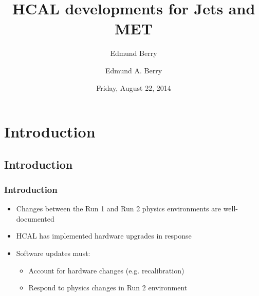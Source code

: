 \documentclass[bigger]{beamer}
\institute[Brown University]{}
\title{HCAL developments for Jets and MET}
\author{Edmund Berry}
\date{Friday, August 22, 2014}
\author[Edmund A. Berry]{\alert{Edmund A. Berry}}
\begin{document}
\maketitle


\section{Introduction}
\label{sec-1}
\subsection{Introduction}
\label{sec-1-1}
\begin{frame}
\frametitle{Introduction}
\label{sec-1-1-1}
\begin{itemize}

\item Changes between the Run 1 and Run 2 physics environments are well-documented
\label{sec-1-1-1-1}%

\item HCAL has implemented hardware upgrades in response
\label{sec-1-1-1-2}%

\item Software updates must:
\label{sec-1-1-1-3}%
\begin{itemize}

\item Account for hardware changes (e.g. recalibration)
\label{sec-1-1-1-3-1}%

\item Respond to physics changes in Run 2 environment
\label{sec-1-1-1-3-2}%
\end{itemize} %
\end{itemize} %
\end{frame}
\end{document}
